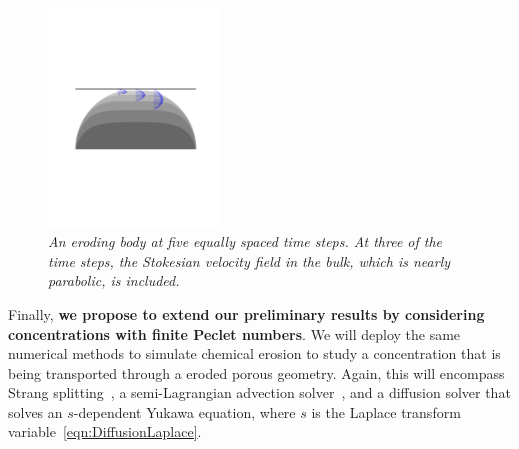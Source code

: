 \documentclass[11pt]{article}
\begin{document}
\begin{figure}
  \includegraphics[width=0.4\textwidth]{figs/porelets_geom}
  \caption{\label{fig:porelets} \em An eroding body at five equally spaced time steps.  At three of the time steps, the Stokesian velocity field in the bulk, which is nearly parabolic, is included.} 
\end{figure}

Finally, {\bf we propose to extend our preliminary results by
considering concentrations with finite Peclet numbers}. We will deploy
the same numerical methods to simulate chemical erosion to study
a concentration that is being transported through a eroded porous
geometry. Again, this will encompass Strang splitting~\cite{str1968}, a
semi-Lagrangian advection solver~\cite{rob1981}, and a diffusion solver
that solves an $s$-dependent Yukawa equation, where $s$ is the Laplace
transform variable~\eqref{eqn:DiffusionLaplace}.

\end{document}
